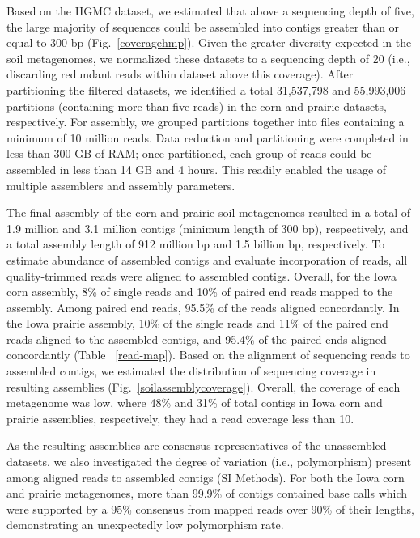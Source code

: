 \documentclass{pnastwo}
\begin{document}
\begin{article}
Based on the HGMC dataset, we estimated that above a sequencing depth of five,
the large majority of sequences could be assembled into contigs greater than or
equal to 300 bp (Fig.~\ref{coveragehmp}). Given the greater diversity expected in
the soil metagenomes, we normalized these datasets to a sequencing depth of 20
(i.e., discarding redundant reads within dataset above this coverage). After
partitioning the filtered datasets, we identified a total 31,537,798 and
55,993,006 partitions (containing more than five reads) in the corn and prairie
datasets, respectively. For assembly, we grouped partitions together into files
containing a minimum of 10 million reads. Data reduction and partitioning were
completed in less than 300 GB of RAM; once partitioned, each group of reads
could be assembled in less than 14 GB and 4 hours. This readily enabled the
usage of multiple assemblers and assembly parameters.

The final assembly of the corn and prairie soil metagenomes resulted in a total
of 1.9 million and 3.1 million contigs (minimum length of 300 bp), respectively,
and a total assembly length of 912 million bp and 1.5 billion bp, respectively.
To estimate abundance of assembled contigs and evaluate incorporation of reads,
all quality-trimmed reads were aligned to assembled contigs. Overall, for the
Iowa corn assembly, 8\% of single reads and 10\% of paired end reads mapped to
the assembly. Among paired end reads, 95.5\% of the reads aligned concordantly.
In the Iowa prairie assembly, 10\% of the single reads and 11\% of the paired
end reads aligned to the assembled contigs, and 95.4\% of the paired ends
aligned concordantly (Table ~\ref{read-map}). Based on the alignment of
sequencing reads to assembled contigs, we estimated the distribution of
sequencing coverage in resulting assemblies (Fig.~\ref{soilassemblycoverage}).
Overall, the coverage of each metagenome was low, where 48\% and 31\% of total
contigs in Iowa corn and prairie assemblies, respectively, they had a read
coverage less than 10.

As the resulting assemblies are consensus representatives of the unassembled
datasets, we also investigated the degree of variation (i.e., polymorphism)
present among aligned reads to assembled contigs (SI Methods). 
For both the Iowa corn and prairie metagenomes, more than 99.9\% of
contigs contained base calls which were supported by a 95\% consensus from
mapped reads over 90\% of their lengths, demonstrating an unexpectedly low
polymorphism rate.
 

\end{article}
\end{document}
